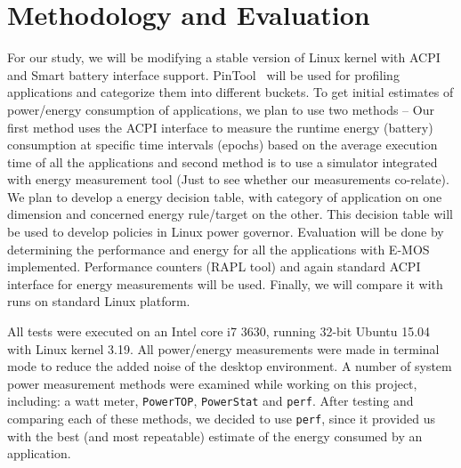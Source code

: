 \section{Methodology and Evaluation}\label{sec:meth}

For our study, we will be modifying a stable version of Linux kernel with ACPI and Smart battery interface support. PinTool~\cite{pin} will be used for profiling applications and categorize them into different buckets. To get initial estimates of power/energy consumption of applications, we plan to use two methods -- Our first method uses the ACPI interface to measure the runtime energy (battery) consumption at specific time intervals (epochs) based on the average execution time of all the applications and second method is to use a simulator integrated with energy measurement tool (Just to see whether our measurements co-relate). 
We plan to develop a energy decision table, with category of application on one dimension and concerned energy rule/target on the other. This decision table will be used to develop policies in Linux power governor.  
Evaluation will be done by determining the performance and energy for all the applications with E-MOS implemented. Performance counters (RAPL tool) and again standard ACPI interface for energy measurements will be used.
Finally, we will compare it with runs on standard Linux platform. 
\fi

All tests were executed on an Intel core i7 3630, running 32-bit Ubuntu 15.04 with Linux kernel 3.19. 
All power/energy measurements were made in terminal mode to reduce the added noise of the desktop environment. 
A number of system power measurement methods were examined while working on this project, including: a watt 
meter, \texttt{PowerTOP}, \texttt{PowerStat} and \texttt{perf}. After testing and comparing each of these methods, we decided to use \texttt{perf}, 
since it provided us with the best (and most repeatable) estimate of the energy consumed by an application. 

